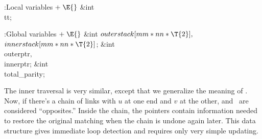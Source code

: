 \B{}:Local variables\X${}\mathrel+\E{}$\6
\&{int} \\{tt};\par
\fi

\B{}:Global variables\X${}\mathrel+\E{}$\6
\&{int} ${}\\{outerstack}[\\{mm}*\\{nn}*\T{2}],{}$ ${}\\{innerstack}[\\{mm}*%
\\{nn}*\T{2}]{}$;\6
\&{int} \\{outerptr}${},{}$ \\{innerptr};\6
\&{int} \\{total\_parity};%
\par
\fi

The inner traversal is very similar, except that we
generalize the meaning
of . Now, if there's a chain of links with $u$ at one end and $v$
at the
other,  and~ are considered ``opposites.'' Inside the chain,
the 
pointers contain information needed to restore the original matching when the
chain is undone again later. This data structure gives immediate loop
detection and requires only very simple updating.

